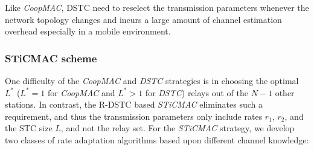 \documentclass[peerreview,draftcls,onecolumn,12pt,a4paper]{IEEEtran}
\begin{document}
Like {\em CoopMAC}, DSTC need to reselect the transmission parameters  whenever the network topology changes and incurs a large amount of channel estimation overhead especially in a mobile environment.

\subsubsection{{STiCMAC} scheme}
One difficulty of the \emph{CoopMAC} and \emph{DSTC} strategies is
in choosing the optimal $L^*$ ($L^*=1$ for \emph{CoopMAC} and
$L^*>1$ for \emph{DSTC}) relays out of the $N-1$ other stations. In contrast, the R-DSTC based
\emph{STiCMAC} eliminates such a requirement, and thus the
transmission parameters only include rates $r_1$, $r_2$, and the
STC size $L$, and not the relay set. For
the  \emph{STiCMAC} strategy, we develop two classes of rate
adaptation algorithms based upon different channel knowledge:
\end{document}
